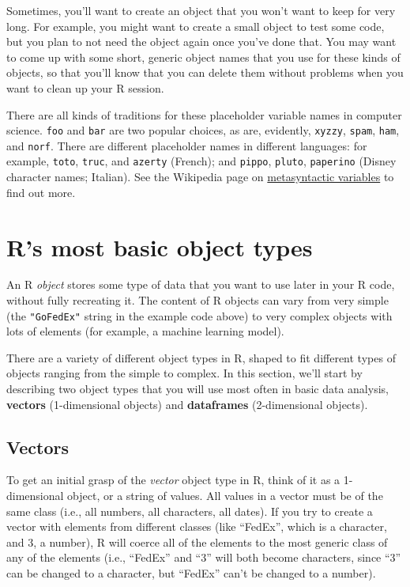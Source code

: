 \documentclass[]{book}
\makeatletter
\newenvironment{kframe}{%
\medskip{}
\setlength{\fboxsep}{.8em}
 \def\at@end@of@kframe{}%
 \ifinner\ifhmode%
  \def\at@end@of@kframe{\end{minipage}}%
  \begin{minipage}{\columnwidth}%
 \fi\fi%
 \def\FrameCommand##1{\hskip\@totalleftmargin \hskip-\fboxsep
 \colorbox{shadecolor}{##1}\hskip-\fboxsep
     \hskip-\linewidth \hskip-\@totalleftmargin \hskip\columnwidth}%
 \MakeFramed {\advance\hsize-\width
   \@totalleftmargin\z@ \linewidth\hsize
   \@setminipage}}%
 {\par\unskip\endMakeFramed%
 \at@end@of@kframe}
\newenvironment{rmdblock}[1]
  {
  \begin{itemize}
  \renewcommand{\labelitemi}{
    \raisebox{-.7\height}[0pt][0pt]{
      {\setkeys{Gin}{width=3em,keepaspectratio}\texttt{[image: images/\#1]}}
    }
  }
  \setlength{\fboxsep}{1em}
  \begin{kframe}
  \item
  }
  {
  \end{kframe}
  \end{itemize}
  }
\newenvironment{rmdtip}
  {\begin{rmdblock}{tip}}
  {\end{rmdblock}}
\theoremstyle{definition}
\theoremstyle{definition}
\theoremstyle{definition}
\theoremstyle{remark}
\makeatother
\begin{document}
\begin{rmdtip}
Sometimes, you'll want to create an object that you won't want to keep
for very long. For example, you might want to create a small object to
test some code, but you plan to not need the object again once you've
done that. You may want to come up with some short, generic object names
that you use for these kinds of objects, so that you'll know that you
can delete them without problems when you want to clean up your R
session.

There are all kinds of traditions for these placeholder variable names
in computer science. \texttt{foo} and \texttt{bar} are two popular
choices, as are, evidently, \texttt{xyzzy}, \texttt{spam}, \texttt{ham},
and \texttt{norf}. There are different placeholder names in different
languages: for example, \texttt{toto}, \texttt{truc}, and
\texttt{azerty} (French); and \texttt{pippo}, \texttt{pluto},
\texttt{paperino} (Disney character names; Italian). See the Wikipedia
page on
\href{https://en.wikipedia.org/wiki/Metasyntactic_variable}{metasyntactic
variables} to find out more.
\end{rmdtip}

\section{R's most basic object types}\label{rs-most-basic-object-types}

An R \emph{object} stores some type of data that you want to use later
in your R code, without fully recreating it. The content of R objects
can vary from very simple (the \texttt{"GoFedEx"} string in the example
code above) to very complex objects with lots of elements (for example,
a machine learning model).

There are a variety of different object types in R, shaped to fit
different types of objects ranging from the simple to complex. In this
section, we'll start by describing two object types that you will use
most often in basic data analysis, \textbf{vectors} (1-dimensional
objects) and \textbf{dataframes} (2-dimensional objects).

\subsection{Vectors}\label{vectors}

To get an initial grasp of the \emph{vector} object type in R, think of
it as a 1-dimensional object, or a string of values. All values in a
vector must be of the same class (i.e., all numbers, all characters, all
dates). If you try to create a vector with elements from different
classes (like ``FedEx'', which is a character, and 3, a number), R will
coerce all of the elements to the most generic class of any of the
elements (i.e., ``FedEx'' and ``3'' will both become characters, since
``3'' can be changed to a character, but ``FedEx'' can't be changed to a
number).
\end{document}
